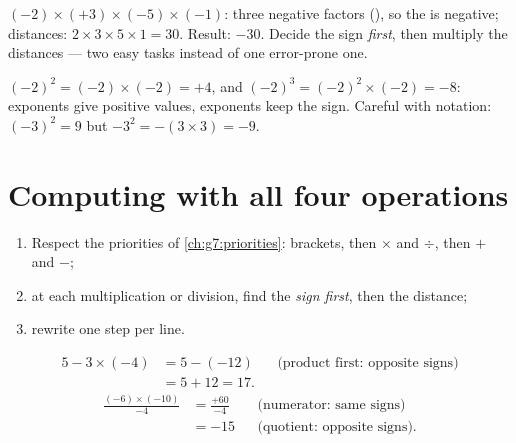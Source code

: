 \begin{example}\label{ex:g8:negprod:many}
$(-2) \times (+3) \times (-5) \times (-1)$: three negative factors
(), so the  is negative; distances: $2 \times 3 \times 5
\times 1 = 30$. Result: $-30$. Decide the sign \emph{first}, then
multiply the distances --- two easy tasks instead of one error-prone
one.
\end{example}

\begin{example}\label{ex:g8:negprod:powers}
$(-2)^2 = (-2) \times (-2) = +4$, and
$(-2)^3 = (-2)^2 \times (-2) = -8$:  exponents give positive
values,  exponents keep the sign. Careful with notation:
$(-3)^2 = 9$ but $-3^2 = -(3 \times 3) = -9$.
\end{example}

\section{Computing with all four operations}

\begin{method}\label{met:g8:negprod:compute}
\begin{enumerate}
  \item Respect the priorities of \cref{ch:g7:priorities}: brackets,
        then $\times$ and $\div$, then $+$ and $-$;
  \item at each multiplication or division, find the \emph{sign
        first}, then the distance;
  \item rewrite one step per line.
\end{enumerate}
\end{method}

\begin{example}\label{ex:g8:negprod:compute}
\begin{align*}
5 - 3 \times (-4)
&= 5 - (-12) && \text{(product first: opposite signs)}\\
&= 5 + 12 = 17 .
\end{align*}
\begin{align*}
\frac{(-6) \times (-10)}{-4}
&= \frac{+60}{-4} && \text{(numerator: same signs)}\\
&= -15 && \text{(quotient: opposite signs).}
\end{align*}
\end{example}

